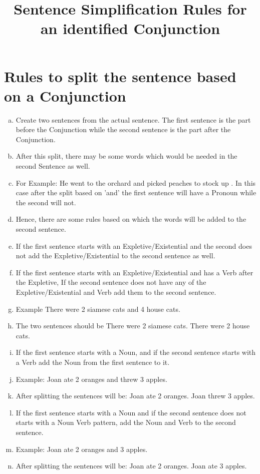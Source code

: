 \documentclass[a4paper,11pt]{article}
\title{Sentence Simplification Rules for an identified Conjunction}
\begin{document}
\maketitle
\section{Rules to split the sentence based on a Conjunction}
\begin{enumerate}[(a)]
\item Create two sentences from the actual sentence. The first sentence is the part before the Conjunction while the second sentence is the part after the Conjunction.
\item After this split, there may be some words which would be needed in the second Sentence as well.
\item For Example: He went to the orchard and picked peaches to stock up . In this case after the split based on 'and' the first sentence will have a Pronoun while the second will not.
\item Hence, there are some rules based on which the words will be added to the second sentence.
\item If the first sentence starts with an Expletive/Existential and the second does not add the Expletive/Existential to the second sentence as well. 
\item If the first sentence starts with an Expletive/Existential and has a Verb after the Expletive, If the second sentence does not have any of the Expletive/Existential and Verb add them to the second sentence.
\item Example There were 2 siamese cats and 4 house cats.
\item The two sentences should be There were 2 siamese cats. There were 2 house cats.
\item If the first sentence starts with a Noun, and if the second sentence starts with a Verb add the Noun from the first sentence to it.
\item Example: Joan ate 2 oranges and threw 3 apples.
\item After splitting the sentences will be: Joan ate 2 oranges. Joan threw 3 apples.
\item If the first sentence starts with a Noun and if the second sentence does not starts with a Noun Verb pattern, add the Noun and Verb to the second sentence.
\item Example: Joan ate 2 oranges and 3 apples.
\item After splitting the sentences will be: Joan ate 2 oranges. Joan ate 3 apples.

\end{enumerate}
\end{document}
